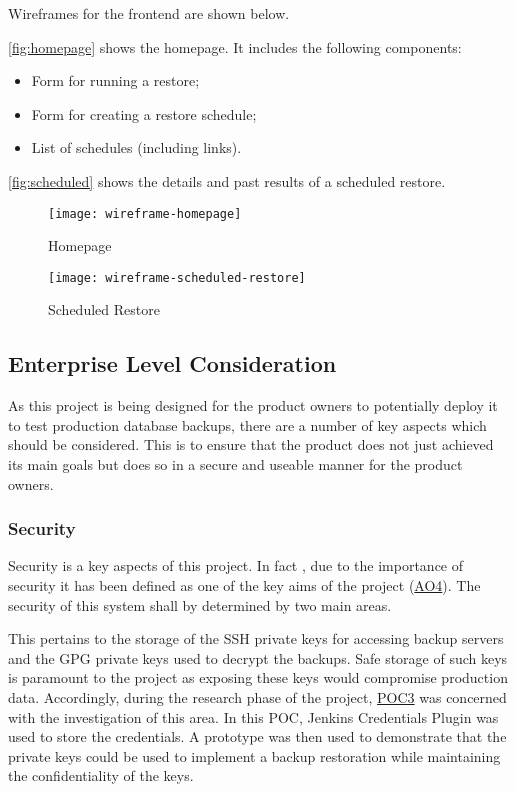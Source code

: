 		Wireframes for the frontend are shown below. 
        
        \autoref{fig:homepage} shows the homepage. It includes the following components:
		\begin{itemize}
			\item Form for running a restore;
			\item Form for creating a restore schedule;
			\item List of schedules (including links).
		\end{itemize}
		\autoref{fig:scheduled} shows the details and past results of a scheduled restore.
		
		
		\begin{figure}[H]
			\setlength{\belowcaptionskip}{15pt plus 3pt minus 2pt}
			\caption{Homepage}
			\centering
			\texttt{[image: wireframe-homepage]}
			\label{fig:homepage}
		\end{figure}
		
		\begin{figure}[H]
			\setlength{\belowcaptionskip}{15pt plus 3pt minus 2pt}
			\caption{Scheduled Restore}
			\centering
			\texttt{[image: wireframe-scheduled-restore]}
			\label{fig:scheduled}
		\end{figure}

	\subsection{Enterprise Level Consideration}
  As this project is being designed for the product owners to potentially deploy it to test production database backups, there are a number of key aspects which should be considered. This is to ensure that the product does not just achieved its main goals but does so in a secure and useable manner for the product owners.
  
  \subsubsection{Security}
  Security is a key aspects of this project. In fact , due to the importance of security it has been defined as one of the key aims of the project (\hyperref[ao4]{AO4}). The security of this system shall by determined by two main areas.
  
  This pertains to the storage of the SSH private keys for accessing backup servers and the GPG private keys used to decrypt the backups. Safe storage of such keys is paramount to the project as exposing these keys would compromise production data. Accordingly, during the research phase of the project, \hyperref[poc3]{POC3} was concerned with the investigation of this area.
  In this POC, Jenkins Credentials Plugin was used to store the credentials. A prototype was then used to demonstrate that the private keys could be used to implement a backup restoration while maintaining the confidentiality of the keys.
  
